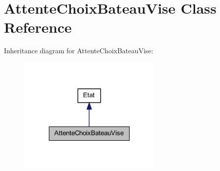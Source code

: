 \hypertarget{class_attente_choix_bateau_vise}{
\section{AttenteChoixBateauVise Class Reference}
\label{class_attente_choix_bateau_vise}
}


Inheritance diagram for AttenteChoixBateauVise:
\nopagebreak
\begin{figure}[H]
\begin{center}
\leavevmode
\includegraphics[width=202pt]{class_attente_choix_bateau_vise__inherit__graph}
\end{center}
\end{figure}


